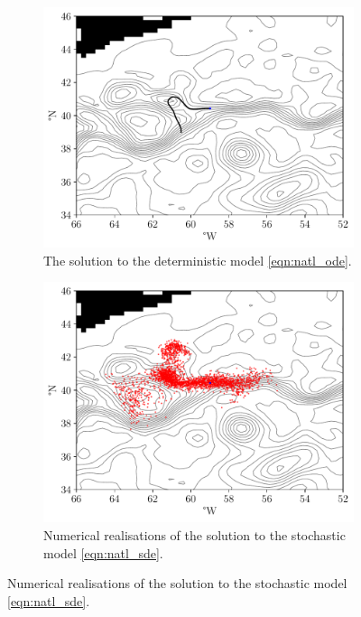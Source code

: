 \begin{figure}
	\begin{center}
		\begin{subfigure}[t]{0.49\textwidth}
			\includegraphics[width=\textwidth]{chp06_applications/figures/gulf_stream/det_traj.pdf}
			\caption{The solution to the deterministic model \cref{eqn:natl_ode}.}
			\label{fig:natl_det_traj}
		\end{subfigure}
		\begin{subfigure}[t]{0.49\textwidth}
			\includegraphics[width=\textwidth]{chp06_applications/figures/gulf_stream/traj_stoch_rels}
			\caption{Numerical realisations of the solution to the stochastic model \cref{eqn:natl_sde}.}

\end{subfigure}
\end{center}
\end{figure}
